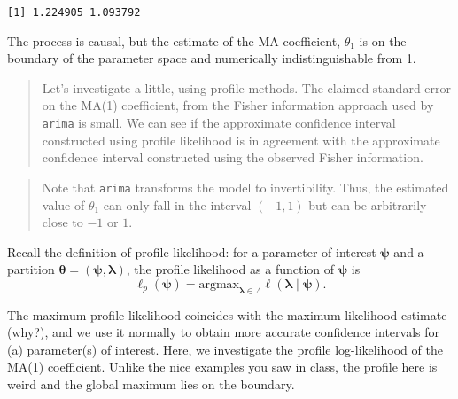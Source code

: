 \documentclass[]{book}
\newenvironment{Shaded}{\begin{snugshade}}{\end{snugshade}}
\newcommand{\KeywordTok}[1]{\textcolor[rgb]{0.13,0.29,0.53}{\textbf{#1}}}
\newcommand{\DecValTok}[1]{\textcolor[rgb]{0.00,0.00,0.81}{#1}}
\newcommand{\StringTok}[1]{\textcolor[rgb]{0.31,0.60,0.02}{#1}}
\newcommand{\OperatorTok}[1]{\textcolor[rgb]{0.81,0.36,0.00}{\textbf{#1}}}
\newcommand{\NormalTok}[1]{#1}
\begin{document}
\begin{Shaded}
\end{Shaded}

\begin{verbatim}
[1] 1.224905 1.093792
\end{verbatim}

The process is causal, but the estimate of the MA coefficient,
\(\theta_1\) is on the boundary of the parameter space and numerically
indistinguishable from 1.

\begin{quote}
Let's investigate a little, using profile methods. The claimed standard
error on the MA(1) coefficient, from the Fisher information approach
used by \texttt{arima} is small. We can see if the approximate
confidence interval constructed using profile likelihood is in agreement
with the approximate confidence interval constructed using the observed
Fisher information.
\end{quote}

\begin{quote}
Note that \texttt{arima} transforms the model to invertibility. Thus,
the estimated value of \(\theta_1\) can only fall in the interval
\((−1, 1)\) but can be arbitrarily close to \(−1\) or \(1\).
\end{quote}

Recall the definition of profile likelihood: for a parameter of interest
\(\boldsymbol{\psi}\) and a partition
\(\boldsymbol{\theta}=(\boldsymbol{\psi}, \boldsymbol{\lambda})\), the
profile likelihood as a function of \(\boldsymbol{\psi}\) is
\[\ell_p(\boldsymbol{\psi}) = \mathrm{argmax}_{\boldsymbol{\lambda} \in \Lambda} \ell(\boldsymbol{\lambda} \mid \boldsymbol{\psi}).\]

The maximum profile likelihood coincides with the maximum likelihood
estimate (why?), and we use it normally to obtain more accurate
confidence intervals for (a) parameter(s) of interest. Here, we
investigate the profile log-likelihood of the MA(1) coefficient. Unlike
the nice examples you saw in class, the profile here is weird and the
global maximum lies on the boundary.
\end{document}
